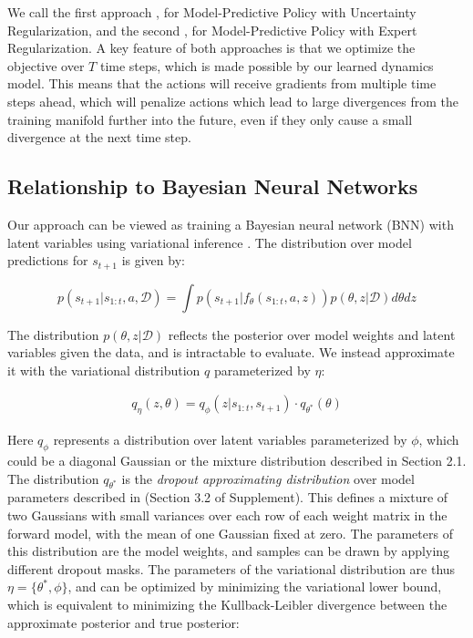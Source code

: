 \documentclass{article} %
\begin{document}
        We call the first approach \modelnamedrop, for Model-Predictive Policy with Uncertainty Regularization, and the second \modelnameil, for Model-Predictive Policy with Expert Regularization.
        A key feature of both approaches is that we optimize the objective over $T$ time steps, which is made possible by our learned dynamics model.
        This means that the actions will receive gradients from multiple time steps ahead, which will penalize actions which lead to large divergences from the training manifold further into the future, even if they only cause a small divergence at the next time step.

\subsection{Relationship to Bayesian Neural Networks}

Our approach can be viewed as training a Bayesian neural network (BNN) \citep{Neal1995} with latent variables using variational inference \citep{Jordan1999, VAE}. 
The distribution over model predictions for $s_{t+1}$ is given by:

\begin{equation*}
  p(s_{t+1} | s_{1:t}, a, \mathcal{D}) = \int p(s_{t+1} | f_\theta(s_{1:t}, a, z)) p(\theta, z | \mathcal{D}) d\theta dz
\end{equation*}

The distribution $p(\theta, z | \mathcal{D})$ reflects the posterior over model weights and latent variables given the data, and is intractable to evaluate.
We instead approximate it with the variational distribution $q$ parameterized by $\eta$:

\begin{align*}
  q_\eta(z, \theta) = q_\phi(z | s_{1:t}, s_{t+1}) \cdot q_{\theta^*}(\theta)
\end{align*}

Here $q_\phi$ represents a distribution over latent variables parameterized by $\phi$, which could be a diagonal Gaussian or the mixture distribution described in Section 2.1. 
The distribution $q_{\theta^*}$ is the \textit{dropout approximating distribution} over model parameters described in \citep{Gal16} (Section 3.2 of Supplement). 
This defines a mixture of two Gaussians with small variances over each row of each weight matrix in the forward model, with the mean of one Gaussian fixed at zero. The parameters of this distribution are the model weights, and samples can be drawn by applying different dropout masks. The parameters of the variational distribution are thus $\eta = \{ \theta^*, \phi \}$, 
and can be optimized by minimizing the variational lower bound, which is equivalent to minimizing the Kullback-Leibler divergence between the approximate posterior and true posterior:
\end{document}
